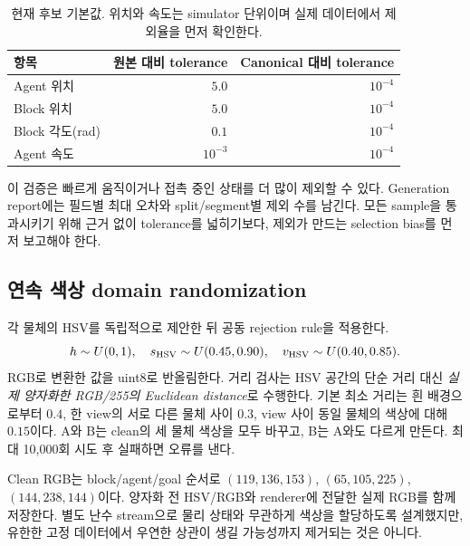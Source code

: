 \documentclass[11pt,a4paper]{article}
\begin{document}
\begin{table}[htbp]\centering\small
\begin{tabular}{lrr}
\toprule 항목 & 원본 대비 tolerance & Canonical 대비 tolerance \\\midrule
Agent 위치 & $5.0$ & $10^{-4}$ \\
Block 위치 & $5.0$ & $10^{-4}$ \\
Block 각도(rad) & $0.1$ & $10^{-4}$ \\
Agent 속도 & $10^{-3}$ & $10^{-4}$ \\\bottomrule
\end{tabular}
\caption{현재 후보 기본값. 위치와 속도는 simulator 단위이며 실제 데이터에서 제외율을 먼저 확인한다.}
\end{table}
이 검증은 빠르게 움직이거나 접촉 중인 상태를 더 많이 제외할 수 있다.
Generation report에는 필드별 최대 오차와 split/segment별 제외 수를 남긴다.
모든 sample을 통과시키기 위해 근거 없이 tolerance를 넓히기보다, 제외가 만드는
selection bias를 먼저 보고해야 한다.

\subsection{연속 색상 domain randomization}
각 물체의 HSV를 독립적으로 제안한 뒤 공동 rejection rule을 적용한다.
\begin{equation}
h\sim U(0,1),\quad s_{\rm HSV}\sim U(0.45,0.90),\quad
v_{\rm HSV}\sim U(0.40,0.85).
\end{equation}
RGB로 변환한 값을 uint8로 반올림한다. 거리 검사는 HSV 공간의 단순 거리 대신
\emph{실제 양자화한 RGB/255의 Euclidean distance}로 수행한다.
기본 최소 거리는 흰 배경으로부터 $0.4$, 한 view의 서로 다른 물체 사이 $0.3$,
view 사이 동일 물체의 색상에 대해 $0.15$이다. A와 B는 clean의 세 물체 색상을
모두 바꾸고, B는 A와도 다르게 만든다. 최대 10,000회 시도 후 실패하면 오류를 낸다.

Clean RGB는 block/agent/goal 순서로 $(119,136,153)$, $(65,105,225)$,
$(144,238,144)$이다. 양자화 전 HSV/RGB와 renderer에 전달한 실제 RGB를 함께
저장한다. 별도 난수 stream으로 물리 상태와 무관하게 색상을 할당하도록 설계했지만,
유한한 고정 데이터에서 우연한 상관이 생길 가능성까지 제거되는 것은 아니다.
\end{document}
